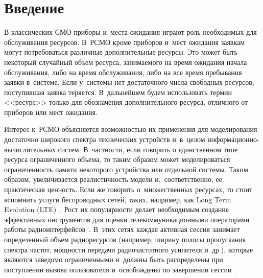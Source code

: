 
  



\thispagestyle{headings}

\begin{multicols}{2}

\label{st\stat}

\section{Введение}

В классических СМО приборы и~места ожидания 
играют роль необходимых для обслуживания ресурсов. В~РСМО кроме 
приборов и~мест ожидания заявкам могут потребоваться различные дополнительные 
ресурсы. Это может быть некоторый случайный объем ресурса, занимаемого на время 
ожидания начала обслуживания, либо на время обслуживания, либо на все время 
пребывания заявки в~сис\-те\-ме. Если у~сис\-те\-мы нет достаточного числа свободных 
ресурсов, поступившая заявка теряется. В~дальнейшем будем использовать термин 
<<ресурс>> только для обозначения дополнительного ресурса, отличного от приборов 
или мест ожидания.

Интерес к~РСМО объясняется возможностью их применения для моделирования 
достаточно широкого спектра технических устройств 
и~в~целом ин\-фор\-ма\-ци\-он\-но-вы\-чис\-ли\-тель\-ных систем.
В~частности, если говорить о единственном типе ресурса ограниченного объема, то 
таким образом может моделироваться ограниченность памяти некоторого устройства 
или отдельной системы.
Таким образом, увеличивается реалистичность модели и,~соответственно, ее 
практическая цен\-ность.
%
Если же говорить о~множественных ресурсах, то стоит вспом\-нить услуги 
беспроводных сетей, таких, например, как Long Term Evolution (LTE)~\cite{Andrews}.
 Рост их популярности делает необходимым создание эффективных 
инструментов для оценки телекоммуникационными операторами работы 
радиоинтерфейсов~\cite{Galinina,Samuylov}. В~этих сетях каждая активная сессия 
занимает определенный объем радиоресурсов (например, ширину полосы пропускания 
спектра час\-тот, мощ\-ности передачи радиочастотного усилителя и~др.), которые 
являются заведомо ограниченными и~должны быть распределены при поступлении 
вызова пользователя и~освобождены по завершении сессии~\cite{Naumov_3_2016}.


\end{multicols}
